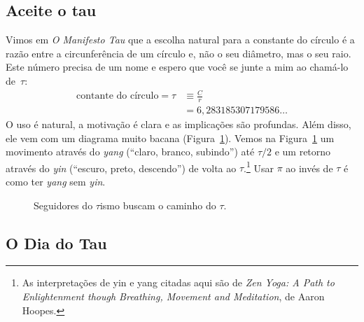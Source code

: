
  \subsection{Aceite o tau} %
  \label{sec:embrace_the_tau}

Vimos em \emph{O Manifesto Tau} que a escolha natural para a constante do círculo é a razão entre a circunferência de um círculo e, não o seu diâmetro, mas o seu raio. Este número precisa de um nome e espero que você se junte a mim ao chamá-lo de~$\tau$:
\[
\begin{split}
\mbox{contante do círculo} = \tau & \equiv \frac{C}{r} \\
                              & = 6,283185307179586\ldots
\end{split}
\]
O uso é natural, a motivação é clara e as implicações são profundas. Além disso, ele vem com um diagrama muito bacana (Figura~\ref{fig:tauism}). Vemos na Figura~\ref{fig:tauism} um movimento através do \emph{yang} (``claro, branco, subindo'') até $\tau/2$ e um retorno através do \emph{yin} (``escuro, preto, descendo'') de volta ao $\tau$.\footnote{As interpretações de yin e yang citadas aqui são de \emph{Zen Yoga: A Path to Enlightenment though Breathing, Movement and Meditation}, de Aaron Hoopes.} Usar $\pi$ ao invés de $\tau$ é como ter \emph{yang} sem \emph{yin}.

\begin{figure}
\begin{center}
\end{center}
\caption{Seguidores do $\tau$ismo buscam o caminho do $\tau$.\label{fig:tauism}}
\end{figure}



  \subsection{O Dia do Tau} %
  \label{sec:tau_day}

